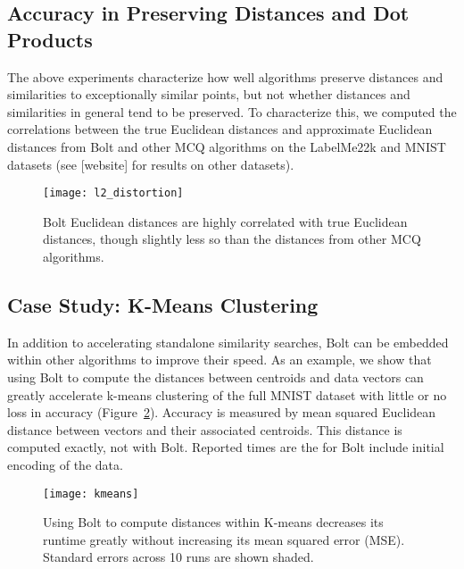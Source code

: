 
\subsection{Accuracy in Preserving Distances and Dot Products}

The above experiments characterize how well algorithms preserve distances and similarities to exceptionally similar points, but not whether distances and similarities in general tend to be preserved. To characterize this, we computed the correlations between the true Euclidean distances and approximate Euclidean distances from Bolt and other MCQ algorithms on the LabelMe22k and MNIST datasets (see [website] for results on other datasets).

\begin{figure}[h]
\begin{center}
\label{fig:corr_acc}
\texttt{[image: l2\_distortion]}
\caption{Bolt Euclidean distances are highly correlated with true Euclidean distances, though slightly less so than the distances from other MCQ algorithms.}
\end{center}
\end{figure}



\subsection{Case Study: K-Means Clustering}

In addition to accelerating standalone similarity searches, Bolt can be embedded within other algorithms to improve their speed. As an example, we show that using Bolt to compute the distances between centroids and data vectors can greatly accelerate k-means clustering of the full MNIST dataset with little or no loss in accuracy (Figure~\ref{fig:kmeans}). Accuracy is measured by mean squared Euclidean distance between vectors and their associated centroids. This distance is computed exactly, not with Bolt. Reported times are the for Bolt include initial encoding of the data.

\begin{figure}[h]
\begin{center}
\label{fig:kmeans}
\texttt{[image: kmeans]}
\caption{Using Bolt to compute distances within K-means decreases its runtime greatly without increasing its mean squared error (MSE). Standard errors across 10 runs are shown shaded.}
\end{center}
\end{figure}

